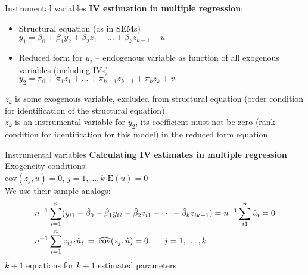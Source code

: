 \documentclass[usenames,dvipsnames]{beamer}
\begin{document}
\begin{frame}{Instrumental variables}
\textbf{IV estimation in multiple regression}: 
\begin{itemize}
\item Structural equation (as in SEMs) \\
$y_1=\beta_0+\beta_1 y_2+\beta_2 z_1+ \dots + \beta_k z_{k-1} +u$\\
\smallskip
\item Reduced form for $y_2$ – endogenous variable as function of all exogenous variables (including IVs) \\
$y_2=\pi_0+\pi_1 z_1+ \dots + \pi_{k-1} z_{k-1}+\pi_k z_k + v$
\end{itemize}
\vspace{0.3cm}
$z_k$ is some exogenous variable, excluded from structural equation (order condition for identification of the structural equation),\\
\vspace{0.3cm}
$z_k$ is an instrumental variable for $y_2$, its coefficient must not be zero (rank condition for identification for this model) in the reduced form equation.
\end{frame}
\begin{frame}{Instrumental variables}
\textbf{Calculating IV estimates in multiple regression} \\
Exogeneity conditions: \\
\vspace{0.2cm}
$\mathrm{cov}(z_j,u)=0$, \quad $j=1, \dots , k$ \quad $\mathrm{E}(u)=0$ \\
\vspace{0.3cm}
We use their sample analogs:
\begin{align*}
n^{-1} & \sum_{i=1}^n (y_{i1}-\hat{\beta}_0-\hat{\beta}_1 y_{i2}-\hat{\beta}_2 z_{i1}- \dots- \hat{\beta}_k z_{ik-1})=n^{-1} \sum_{i1}^n \hat{u}_{i}=0 \\
n^{-1} & \sum_{i=1}^n z_{ij} \! \cdot \! \hat{u}_{i} \> = \> \widehat{\mathrm{cov}}(z_j, \hat{u}) = 0,  \hspace{0.5cm} j = 1, \dots , k 
\end{align*}
$k+1$ equations for $k+1$ estimated parameters
\end{frame}
\end{document}
